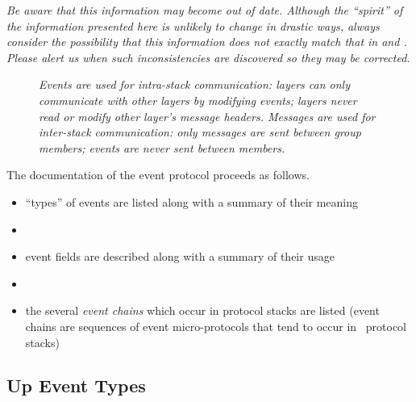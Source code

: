 \emph{Be aware that this information may become out of date.  Although the
``spirit'' of the information presented here is unlikely to change in
drastic ways, always consider the possibility that this information does
not exactly match that in  and .
Please alert us when such inconsistencies are discovered so they may be
corrected.}

\begin{figure}[tb]
\begin{center}
\end{center}
\caption{\em Events are used for intra-stack communication: layers can only
communicate with other layers by modifying events; layers never read or
modify other layer's message headers.  Messages are used for inter-stack
communication: only messages are sent between group members; events are
never sent between members.}
\label{comm:event}
\end{figure}

The documentation of the event protocol proceeds as follows.
\begin{itemize}
\item
``types'' of events are listed along with a summary of their meaning
\item
{}
\item
event fields are described along with a summary of their usage
\item
{}
\item
the several \emph{event chains} which occur in protocol stacks are listed
(event chains are sequences of event micro-protocols that tend to occur in
\ensemble\ protocol stacks)
\end{itemize}


\subsection{Up Event Types}

